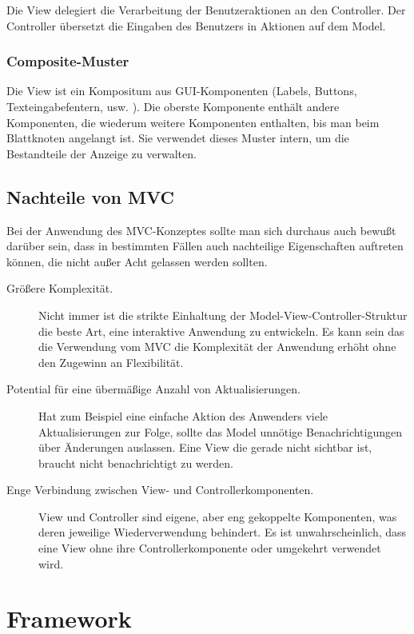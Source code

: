 \documentclass[11pt,a4paper,titlepage]{scrreprt}
\begin{document}
Die View delegiert die Verarbeitung der Benutzeraktionen an den Controller. Der Controller
übersetzt die Eingaben des Benutzers in Aktionen auf dem Model.

\subsection{Composite-Muster}
Die View ist ein Kompositum aus GUI-Komponenten (Labels, Buttons, Texteingabefentern, usw. ).
Die oberste Komponente enthält andere Komponenten, die wiederum weitere Komponenten enthalten,
bis man beim Blattknoten angelangt ist. Sie verwendet dieses Muster intern, um die Bestandteile
der Anzeige zu verwalten.

\section{Nachteile von MVC}
Bei der Anwendung des MVC-Konzeptes sollte man sich durchaus auch bewußt darüber sein,
dass in bestimmten Fällen auch nachteilige Eigenschaften auftreten können, die nicht 
außer Acht gelassen werden sollten. \citep[vgl. S. 142]{Buschmann199801}

\begin{description}
\item[Größere Komplexität.]
Nicht immer ist die strikte Einhaltung der Model-View-Controller-Struktur die beste Art, eine
interaktive Anwendung zu entwickeln. Es kann sein das die Verwendung vom MVC die Komplexität
der Anwendung erhöht ohne den Zugewinn an Flexibilität.


\item[Potential für eine übermäßige Anzahl von Aktualisierungen.] Hat zum Beispiel eine
einfache Aktion des Anwenders viele Aktualisierungen zur Folge, sollte das Model unnötige
Benachrichtigungen über Änderungen auslassen. Eine View die gerade nicht sichtbar ist, braucht
nicht benachrichtigt zu werden.

\item[Enge Verbindung zwischen View- und Controllerkomponenten.] View und Controller sind
eigene, aber eng gekoppelte Komponenten, was deren jeweilige Wiederverwendung behindert.
Es ist unwahrscheinlich, dass eine View ohne ihre Controllerkomponente oder umgekehrt
verwendet wird.
\end{description}

\chapter{Framework}
\end{document}
